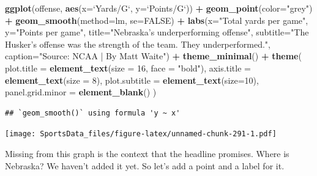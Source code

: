 \documentclass[
]{book}
\newenvironment{Shaded}{\begin{snugshade}}{\end{snugshade}}
\newcommand{\DataTypeTok}[1]{\textcolor[rgb]{0.13,0.29,0.53}{#1}}
\newcommand{\DecValTok}[1]{\textcolor[rgb]{0.00,0.00,0.81}{#1}}
\newcommand{\KeywordTok}[1]{\textcolor[rgb]{0.13,0.29,0.53}{\textbf{#1}}}
\newcommand{\NormalTok}[1]{#1}
\newcommand{\OperatorTok}[1]{\textcolor[rgb]{0.81,0.36,0.00}{\textbf{#1}}}
\newcommand{\OtherTok}[1]{\textcolor[rgb]{0.56,0.35,0.01}{#1}}
\newcommand{\StringTok}[1]{\textcolor[rgb]{0.31,0.60,0.02}{#1}}
\begin{document}
\begin{Shaded}
\begin{Highlighting}[]
\KeywordTok{ggplot}\NormalTok{(offense, }\KeywordTok{aes}\NormalTok{(}\DataTypeTok{x=}\StringTok{`}\DataTypeTok{Yards/G}\StringTok{`}\NormalTok{, }\DataTypeTok{y=}\StringTok{`}\DataTypeTok{Points/G}\StringTok{`}\NormalTok{)) }\OperatorTok{+}\StringTok{ }
\StringTok{  }\KeywordTok{geom_point}\NormalTok{(}\DataTypeTok{color=}\StringTok{"grey"}\NormalTok{) }\OperatorTok{+}\StringTok{ }\KeywordTok{geom_smooth}\NormalTok{(}\DataTypeTok{method=}\NormalTok{lm, }\DataTypeTok{se=}\OtherTok{FALSE}\NormalTok{) }\OperatorTok{+}\StringTok{ }
\StringTok{  }\KeywordTok{labs}\NormalTok{(}\DataTypeTok{x=}\StringTok{"Total yards per game"}\NormalTok{, }\DataTypeTok{y=}\StringTok{"Points per game"}\NormalTok{, }\DataTypeTok{title=}\StringTok{"Nebraska's underperforming offense"}\NormalTok{, }\DataTypeTok{subtitle=}\StringTok{"The Husker's offense was the strength of the team. They underperformed."}\NormalTok{, }\DataTypeTok{caption=}\StringTok{"Source: NCAA | By Matt Waite"}\NormalTok{) }\OperatorTok{+}\StringTok{ }
\StringTok{  }\KeywordTok{theme_minimal}\NormalTok{() }\OperatorTok{+}\StringTok{ }
\StringTok{  }\KeywordTok{theme}\NormalTok{(}
    \DataTypeTok{plot.title =} \KeywordTok{element_text}\NormalTok{(}\DataTypeTok{size =} \DecValTok{16}\NormalTok{, }\DataTypeTok{face =} \StringTok{"bold"}\NormalTok{),}
    \DataTypeTok{axis.title =} \KeywordTok{element_text}\NormalTok{(}\DataTypeTok{size =} \DecValTok{8}\NormalTok{), }
    \DataTypeTok{plot.subtitle =} \KeywordTok{element_text}\NormalTok{(}\DataTypeTok{size=}\DecValTok{10}\NormalTok{), }
    \DataTypeTok{panel.grid.minor =} \KeywordTok{element_blank}\NormalTok{()}
\NormalTok{    ) }
\end{Highlighting}
\end{Shaded}

\begin{verbatim}
## `geom_smooth()` using formula 'y ~ x'
\end{verbatim}

\texttt{[image: SportsData\_files/figure-latex/unnamed-chunk-291-1.pdf]}

Missing from this graph is the context that the headline promises. Where is Nebraska? We haven't added it yet. So let's add a point and a label for it.
\end{document}
